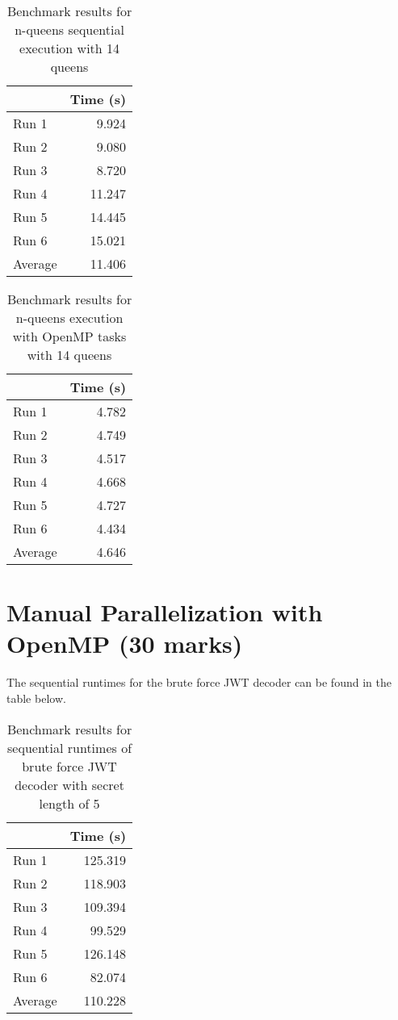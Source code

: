 \documentclass[12pt]{article}
\begin{document}
\begin{table}[H]
  \centering
  \begin{tabular}{lr}
    & {\bf Time (s)} \\
    \hline
    Run 1 & 9.924 \\
    Run 2 & 9.080 \\
    Run 3 & 8.720 \\
    Run 4 & 11.247 \\
    Run 5 & 14.445 \\
    Run 6 & 15.021 \\
    \hline
    Average & 11.406 \\
  \end{tabular}
  \caption{Benchmark results for n-queens sequential execution with 14 queens}
  \label{tbl-nqueens-sequential}
  
\end{table}

\begin{table}[H]
  \centering
  \begin{tabular}{lr}
    & {\bf Time (s)} \\
    \hline
    Run 1 & 4.782 \\
    Run 2 & 4.749 \\
    Run 3 & 4.517 \\
    Run 4 & 4.668 \\
    Run 5 & 4.727 \\
    Run 6 & 4.434 \\
    \hline
    Average & 4.646 \\
  \end{tabular}
  \caption{Benchmark results for n-queens execution with OpenMP tasks with 14 queens}
  \label{tbl-nqueens-tasks}
  
\end{table}


\section*{Manual Parallelization with OpenMP (30 marks)}

The sequential runtimes for the brute force JWT decoder can be found in the table below. 

\begin{table}[H]
  \centering
  \begin{tabular}{lr}
    & {\bf Time (s)} \\
    \hline
    Run 1 & 125.319 \\
    Run 2 & 118.903 \\
    Run 3 & 109.394 \\
    Run 4 & 99.529 \\
    Run 5 & 126.148 \\
    Run 6 & 82.074 \\
    \hline
    Average & 110.228 \\
  \end{tabular}
  \caption{\label{tbl-zeta-sequential}Benchmark results for sequential runtimes of brute force JWT decoder with secret length of 5}
\end{table}
  
\end{document}
